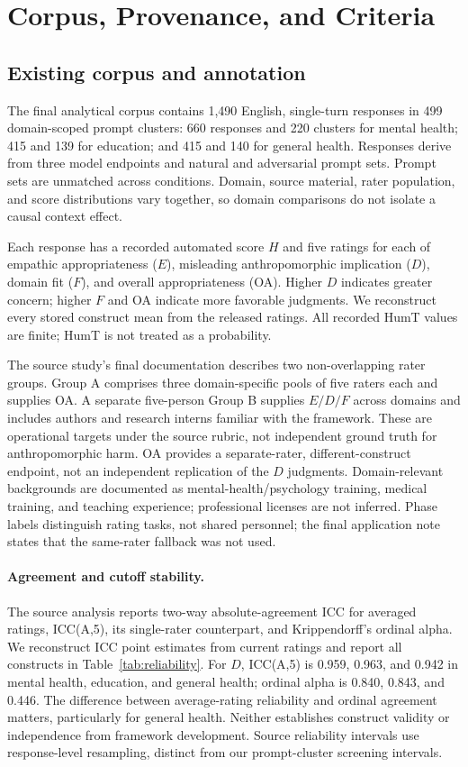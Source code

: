 \documentclass[manuscript,screen,review,anonymous]{acmart}
\begin{document}
\section{Corpus, Provenance, and Criteria}
\subsection{Existing corpus and annotation}
The final analytical corpus contains 1,490 English, single-turn responses in 499 domain-scoped prompt clusters: 660 responses and 220 clusters for mental health; 415 and 139 for education; and 415 and 140 for general health. Responses derive from three model endpoints and natural and adversarial prompt sets. Prompt sets are unmatched across conditions. Domain, source material, rater population, and score distributions vary together, so domain comparisons do not isolate a causal context effect.

Each response has a recorded automated score $H$ and five ratings for each of empathic appropriateness ($E$), misleading anthropomorphic implication ($D$), domain fit ($F$), and overall appropriateness (OA). Higher $D$ indicates greater concern; higher $F$ and OA indicate more favorable judgments. We reconstruct every stored construct mean from the released ratings. All recorded HumT values are finite; HumT is not treated as a probability.

The source study's final documentation describes two non-overlapping rater groups. Group A comprises three domain-specific pools of five raters each and supplies OA. A separate five-person Group B supplies $E/D/F$ across domains and includes authors and research interns familiar with the framework. These are operational targets under the source rubric, not independent ground truth for anthropomorphic harm. OA provides a separate-rater, different-construct endpoint, not an independent replication of the $D$ judgments. Domain-relevant backgrounds are documented as mental-health/psychology training, medical training, and teaching experience; professional licenses are not inferred. Phase labels distinguish rating tasks, not shared personnel; the final application note states that the same-rater fallback was not used.

\paragraph{Agreement and cutoff stability.}
The source analysis reports two-way absolute-agreement ICC for averaged ratings, ICC(A,5), its single-rater counterpart, and Krippendorff's ordinal alpha. We reconstruct ICC point estimates from current ratings and report all constructs in Table~\ref{tab:reliability}. For $D$, ICC(A,5) is 0.959, 0.963, and 0.942 in mental health, education, and general health; ordinal alpha is 0.840, 0.843, and 0.446. The difference between average-rating reliability and ordinal agreement matters, particularly for general health. Neither establishes construct validity or independence from framework development. Source reliability intervals use response-level resampling, distinct from our prompt-cluster screening intervals.
\end{document}

